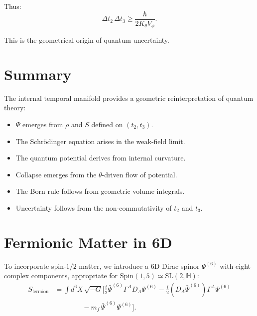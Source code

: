 \documentclass[12pt]{article}
\begin{document}
Thus:
\begin{equation}
\Delta t_2\,\Delta t_3 \geq \frac{\hbar}{2K_\theta V_\phi}.
\end{equation}

This is the geometrical origin of quantum uncertainty.


\newpage
\section{Summary}

The internal temporal manifold provides a geometric reinterpretation of quantum
theory:
\begin{itemize}
\item \(\Psi\) emerges from \(\rho\) and \(S\) defined on \((t_2,t_3)\).
\item The Schrödinger equation arises in the weak-field limit.
\item The quantum potential derives from internal curvature.
\item Collapse emerges from the \(\theta\)-driven flow of potential.
\item The Born rule follows from geometric volume integrals.
\item Uncertainty follows from the non-commutativity of \(t_2\) and \(t_3\).
\end{itemize}


\newpage
\section{Fermionic Matter in 6D}

To incorporate spin-\(1/2\) matter, we introduce a 6D Dirac spinor
\(\Psi^{(6)}\) with eight complex components, appropriate for
\(\mathrm{Spin}(1,5)\simeq\mathrm{SL}(2,\mathbb{H})\):
\begin{align}
S_{\text{fermion}}
&=
\int d^6X\,\sqrt{-G}
\Bigg[
\frac{i}{2}
\bar{\Psi}^{(6)}\Gamma^A D_A \Psi^{(6)}
-
\frac{i}{2}
(D_A \bar{\Psi}^{(6)})\Gamma^A \Psi^{(6)}
\nonumber\\
&\qquad\qquad
- m_f\,\bar{\Psi}^{(6)}\Psi^{(6)}
\Bigg].
\label{eq:fermion6D-action}
\end{align}
\end{document}
